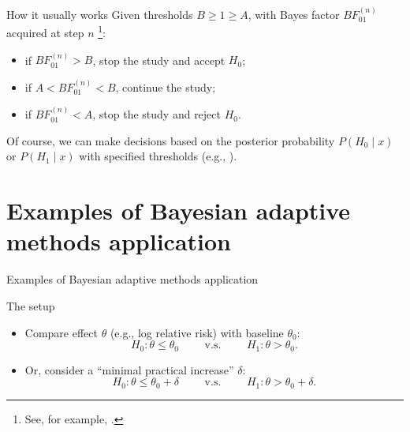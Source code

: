 \documentclass[xcolor=dvipsnames]{beamer}
\begin{document}
\begin{frame}{How it usually works}
Given thresholds $B \geq 1 \geq A$, with Bayes factor $BF_{01}^{(n)}$ acquired at step $n$ \footnote{See, for example, \cite{barnard1946sequential,wetherill1961bayesian,berger1994unified,berger1988likelihood,berger1997unified,berger1999simultaneous}.}:
\begin{itemize}
	\item if $BF_{01}^{(n)} > B$, stop the study and accept $H_0$;
	\item if $A < BF_{01}^{(n)} < B$, continue the study;
	\item  if $BF_{01}^{(n)} < A$, stop the study and reject $H_0$.
\end{itemize}

\pause
\vspace{0.2in}
Of course, we can make decisions based on the posterior probability $P(H_0 \mid x)$ or $P(H_1 \mid x)$ with specified thresholds (e.g., \cite{cornfield1966bayesian}).


    
\end{frame}


\section{Examples of Bayesian adaptive methods application}

\begin{frame}
    \Huge{Examples of Bayesian adaptive methods application}
\end{frame}  

\begin{frame}{The setup}
\begin{itemize}
    \item Compare effect $\theta$ (e.g., log relative risk) with baseline $\theta_0$:
    \begin{equation*}
    H_0: \theta \leq \theta_0 \qquad \text{ v.s. } \qquad H_1: \theta > \theta_0.
    \end{equation*}
    \pause
    \item Or, consider a ``minimal practical increase'' $\delta$:
    \begin{equation*}
    H_0: \theta \leq \theta_0 + \delta \qquad \text{ v.s. } \qquad H_1: \theta > \theta_0 + \delta.
    \end{equation*}
\end{itemize}
    
\end{frame}
\end{document}
